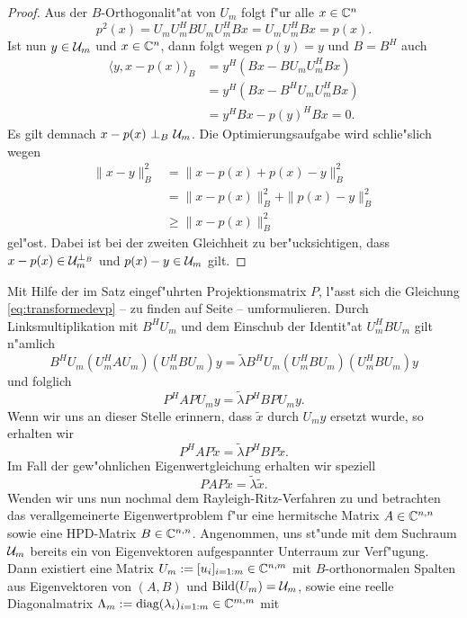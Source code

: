 \begin{proof}
Aus der $B$-Orthogonalit"at von $U_m$ folgt f"ur alle $x\in\mathbb{C}^n$
\[
p^2 (x) = U_m U_m^H B U_m U_m^H B x= U_m U_m^H Bx = p(x).
\]
Ist nun $y\in\mathcal{U}_m$ und $x\in\mathbb{C}^n$, dann folgt wegen $p(y) = y$ und $B=B^H$ auch
\begin{align*}
\langle y, x-p(x)\rangle_B &= y^H (Bx - B U_m U_m^H Bx) \\
&= y^H (Bx - B^H U_m U_m^H Bx) \\
&= y^H Bx - p(y)^H Bx = 0.
\end{align*}
Es gilt demnach $x-p(x) \ \bot_B \ \mathcal{U}_m$. Die Optimierungsaufgabe wird schlie"slich wegen
\begin{align*}
\|x-y\|_B^2 &= \|x-p(x) + p(x)-y\|_B^2 \\
&= \|x-p(x)\|_B^2 + \|p(x)-y\|_B^2\\
&\ge \|x-p(x)\|_B^2
\end{align*}
gel"ost. Dabei ist bei der zweiten Gleichheit zu ber"ucksichtigen, dass $x-p(x) \in \mathcal{U}_m^{\bot_B}$
und $p(x)-y \in \mathcal{U}_m$ gilt.
\end{proof}
Mit Hilfe der im Satz eingef"uhrten Projektionsmatrix $P$, l"asst sich die Gleichung
\eqref{eq:transformedevp} -- zu finden auf Seite \pageref{eq:transformedevp} -- umformulieren. Durch Linksmultiplikation
mit $B^H U_m$ und dem Einschub der Identit"at $U_m^H B U_m$ gilt n"amlich
\[
B^H U_m (U_m^H A U_m)(U_m^H B U_m)y = \widetilde{\lambda} B^H U_m (U_m^H B U_m)(U_m^H B U_m)y
\]
und folglich
\[
P^H A P U_m y = \widetilde{\lambda} P^H B P U_m y.
\]
Wenn wir uns an dieser Stelle erinnern, dass $\widetilde{x}$ durch $U_m y$ ersetzt wurde, so
erhalten wir
\[
P^H A P \widetilde{x} = \widetilde{\lambda} P^H B P \widetilde{x}.
\]
Im Fall der gew"ohnlichen Eigenwertgleichung erhalten wir speziell
\[
P A P \widetilde{x} = \widetilde{\lambda} \widetilde{x}.
\]
Wenden wir uns nun nochmal dem Rayleigh-Ritz-Verfahren zu und betrachten das
verallgemeinerte Eigenwertproblem f"ur eine hermitsche Matrix $A\in\mathbb{C}^{n,n}$ sowie eine
HPD-Matrix $B\in\mathbb{C}^{n,n}$. Angenommen, uns st"unde mit dem Suchraum $\mathcal{U}_m$ bereits ein von Eigenvektoren
aufgespannter Unterraum zur Verf"ugung. Dann existiert eine Matrix $U_m := [u_i]_{i=1:m}\in\mathbb{C}^{n,m}$ mit
$B$-orthonormalen Spalten aus Eigenvektoren von $(A,B)$ und $\operatorname{Bild}(U_m)=\mathcal{U}_m$, sowie eine reelle Diagonalmatrix
$\Lambda_m := \text{diag}(\lambda_i)_{i=1:m}\in\mathbb{C}^{m,m}$ mit
